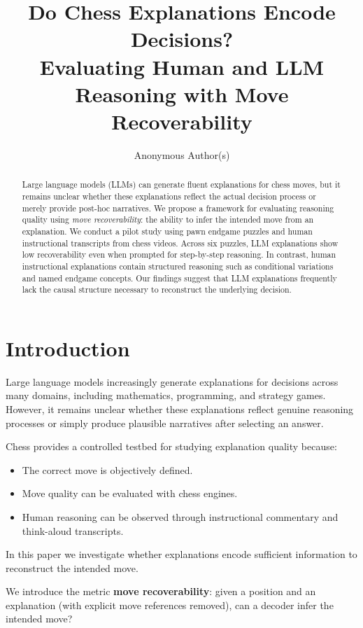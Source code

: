 \documentclass{article}
\title{Do Chess Explanations Encode Decisions?\\
Evaluating Human and LLM Reasoning with Move Recoverability}
\author{
Anonymous Author(s)
}
\begin{document}
\maketitle

\begin{abstract}
Large language models (LLMs) can generate fluent explanations for chess moves, but it remains unclear whether these explanations reflect the actual decision process or merely provide post-hoc narratives. 
We propose a framework for evaluating reasoning quality using \textit{move recoverability}: the ability to infer the intended move from an explanation. 
We conduct a pilot study using pawn endgame puzzles and human instructional transcripts from chess videos. 
Across six puzzles, LLM explanations show low recoverability even when prompted for step-by-step reasoning. 
In contrast, human instructional explanations contain structured reasoning such as conditional variations and named endgame concepts. 
Our findings suggest that LLM explanations frequently lack the causal structure necessary to reconstruct the underlying decision.
\end{abstract}

\section{Introduction}

Large language models increasingly generate explanations for decisions across many domains, including mathematics, programming, and strategy games. 
However, it remains unclear whether these explanations reflect genuine reasoning processes or simply produce plausible narratives after selecting an answer.

Chess provides a controlled testbed for studying explanation quality because:

\begin{itemize}
\item The correct move is objectively defined.
\item Move quality can be evaluated with chess engines.
\item Human reasoning can be observed through instructional commentary and think-aloud transcripts.
\end{itemize}

In this paper we investigate whether explanations encode sufficient information to reconstruct the intended move.

We introduce the metric \textbf{move recoverability}: given a position and an explanation (with explicit move references removed), can a decoder infer the intended move?
\end{document}
